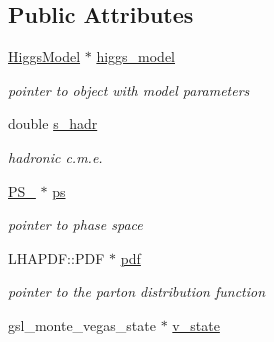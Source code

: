 \subsection*{Public Attributes}
\begin{DoxyCompactItemize}
\item 
\hypertarget{classintegrand__par_a9becf94ac239a82b946f53e36c75c83c}{\hyperlink{classHiggsModel}{Higgs\-Model} $\ast$ \hyperlink{classintegrand__par_a9becf94ac239a82b946f53e36c75c83c}{higgs\-\_\-model}}\label{classintegrand__par_a9becf94ac239a82b946f53e36c75c83c}

\begin{DoxyCompactList}\small\item\em pointer to object with model parameters \end{DoxyCompactList}\item 
\hypertarget{classintegrand__par_a02a52a8cc95edeadf423f181936617d0}{double \hyperlink{classintegrand__par_a02a52a8cc95edeadf423f181936617d0}{s\-\_\-hadr}}\label{classintegrand__par_a02a52a8cc95edeadf423f181936617d0}

\begin{DoxyCompactList}\small\item\em hadronic c.\-m.\-e. \end{DoxyCompactList}\item 
\hypertarget{classintegrand__par_a9c52a4045c079f7314cbc8a876f98238}{\hyperlink{classPS__2}{P\-S\-\_} $\ast$ \hyperlink{classintegrand__par_a9c52a4045c079f7314cbc8a876f98238}{ps}}\label{classintegrand__par_a9c52a4045c079f7314cbc8a876f98238}

\begin{DoxyCompactList}\small\item\em pointer to phase space \end{DoxyCompactList}\item 
\hypertarget{classintegrand__par_a082dc10e0e72baedade3f46cfffa4c15}{L\-H\-A\-P\-D\-F\-::\-P\-D\-F $\ast$ \hyperlink{classintegrand__par_a082dc10e0e72baedade3f46cfffa4c15}{pdf}}\label{classintegrand__par_a082dc10e0e72baedade3f46cfffa4c15}

\begin{DoxyCompactList}\small\item\em pointer to the parton distribution function \end{DoxyCompactList}\item 
\hypertarget{classintegrand__par_a3b5e2c8a2f3c33f0ebc594fd8f42210e}{gsl\-\_\-monte\-\_\-vegas\-\_\-state $\ast$ \hyperlink{classintegrand__par_a3b5e2c8a2f3c33f0ebc594fd8f42210e}{v\-\_\-state}}\label{classintegrand__par_a3b5e2c8a2f3c33f0ebc594fd8f42210e}


\end{DoxyCompactItemize}

